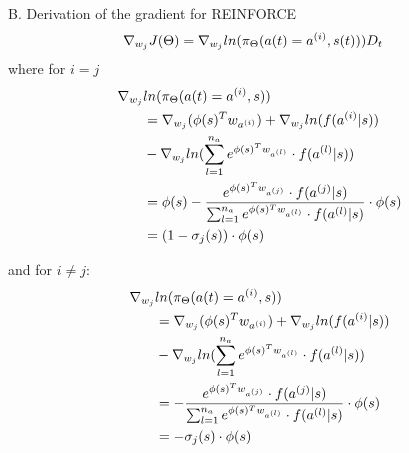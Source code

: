 \documentclass[journal, a4paper]{IEEEtran}
\theoremstyle{plain}
\theoremstyle{definition}
\begin{document}
B. Derivation of the gradient for REINFORCE
\label{appendixB}
\begin{equation}
\begin{split}
	\nabla_{w_j}J(\Theta) & = 
\nabla_{w_j} ln(\pi_\Theta(a(t) = a^{(i)},s(t)))D_t
\notag
\end{split}
\end{equation}
where for $i = j$ 
\begin{equation}
\begin{split}
\nabla_{w_j} & ln(  \pi_\Theta(a(t)= a^{(i)},s)) \\
 &=\nabla_{w_j} (\phi(s)^T w_{a^{(i)}}) + \nabla_{w_j} ln(f(a^{(i)}|s))
\notag
\\
 & - 
\nabla_{w_j} ln(\sum_{l=1}^{n_a} e^{\phi(s)^T w_{a^{(l)}}}\cdot f(a^{(l)}|s))
\notag
\\
& =
\phi(s) - \frac{ e^{\phi(s)^T w_{a^{(j)}}} \cdot f(a^{(j)}|s)}{\sum_{l=1}^{n_a} e^{\phi(s)^T w_{a^{(l)}}}\cdot f(a^{(l)}|s)} \cdot \phi(s)
\notag
\\
&=(1-\sigma_j(s))\cdot \phi(s)
\end{split}
\end{equation}

and for $i \neq j$:
\begin{equation}
\begin{split}
\nabla_{w_j} & ln(\pi_\Theta(a(t) = a^{(i)},s))
\\ 
 & =\nabla_{w_j} (\phi(s)^T w_{a^{(i)}}) + \nabla_{w_j} ln(f(a^{(i)}|s))
\\
 & - 
\nabla_{w_j} ln(\sum_{l=1}^{n_a} e^{\phi(s)^T w_{a^{(l)}}}\cdot f(a^{(l)}|s))
\\
&=- \frac{ e^{\phi(s)^T w_{a^{(j)}}} \cdot f(a^{(j)}|s)}{\sum_{l=1}^{n_a} e^{\phi(s)^T w_{a^{(l)}}}\cdot f(a^{(l)}|s)} \cdot \phi(s)
\\
& =-\sigma_j(s)\cdot \phi(s)
\notag
\end{split}
\end{equation}
\end{document}
